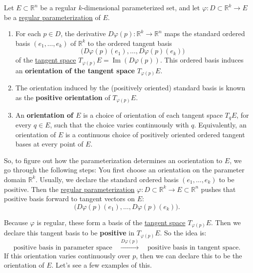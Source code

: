 	\begin{definition}
	  \label{def:orientation-of-a-regular-parameterized-set}
		Let $E \subset \mathbb{R}^n$ be a regular $k$-dimensional parameterized set, and let $\varphi : D \subset \mathbb{R}^k \to E$ be a \hyperref[def:regular-parameterization]{regular parameterization} of $E$. 
		\begin{enumerate}
			\item For each $p \in D$, the derivative $D\varphi(p) : \mathbb{R}^k \to \mathbb{R}^n$	maps the standard ordered basis $(e_1,\dots,e_k)$ of $\mathbb{R}^k$ to the ordered tangent basis
				\begin{equation}
					\bigl(D\varphi(p)(e_1),\dots,D\varphi(p)(e_k)\bigr)
				\end{equation}
				of the \hyperref[def:tangent-space]{tangent space} $T_{\varphi(p)}E = \operatorname{Im}(D\varphi(p))$.
				This ordered basis induces an \textbf{orientation of the tangent space} $T_{\varphi(p)}E$.

			\item The orientation induced by the (positively oriented) standard basis is known as the \textbf{positive orientation} of $T_{\varphi(p)} E$. 

			\item An \textbf{orientation of $E$} is a choice of orientation of each tangent space $T_qE$, for every $q \in E$, such that the choice varies continuously with $q$. Equivalently, an orientation of $E$ is a continuous choice of positively oriented ordered tangent bases at every point of $E$.
		\end{enumerate}
	\end{definition}

	So, to figure out how the parameterization determines an oorientation to $E$, we go through the following steps:  You first choose an orientation on the parameter domain $\mathbb{R}^k$. Usually, we declare the standard ordered basis $(e_1,\dots,e_k)$ to be positive. Then the \hyperref[def:regular-parameterization]{regular parameterization} $\varphi : D \subset \mathbb{R}^k \to E \subset \mathbb{R}^n$ pushes that positive basis forward to tangent vectors on $E$:
	\begin{equation}
		\big( D\varphi(p)(e_1), \ldots, D\varphi(p)(e_k) \big).
	\end{equation}

	Because $\varphi$ is regular, these form a basis of the \hyperref[def:tangent-space]{tangent space} $T_{\varphi(p)}E$. Then we declare this tangent basis to be \textbf{positive} in $T_{\varphi(p)}E$. So the idea is:
	\begin{equation}
		\text{positive basis in parameter space} \quad \xrightarrow{D\varphi(p)} \quad \text{positive basis in tangent space}.
	\end{equation}
	If this orientation varies continuously over $p$, then we can declare this to be the orientation of $E$. Let's see a few examples of this. 
			
